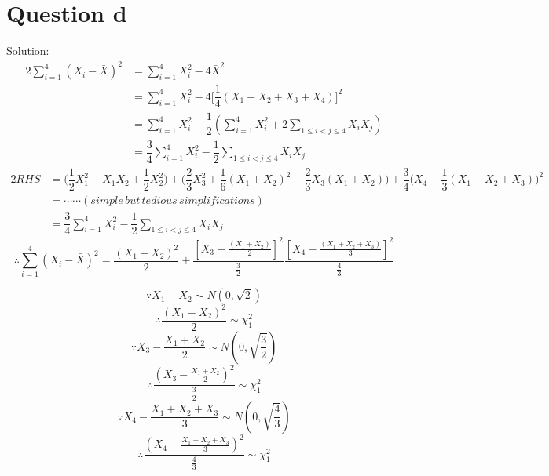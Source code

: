 \documentclass[a4papers]{ctexart}
\begin{document}
\section*{Question d}
\noindent Solution:
\begin{alignat*}{2}
    \sum_{i=1}^{4}\left( X_{i}-\bar {X}\right) ^{2}
    &=\sum ^{4}_{i=1}X^{2}_{i}-4\bar {X}^{2}\\
    &=\sum ^{4}_{i=1}X^{2}_{i}-4\Big[ \dfrac{1}{4}(X_1+X_2+X_3+X_4) \Big]^{2}\\  
    &=\sum ^{4}_{i=1}X^{2}_{i}-\dfrac {1}{2}\left( \sum ^{4}_{i=1}X^{2}_{i}+2\sum _{1\leq i < j\leq 4}X_{i}X_{j}\right) \\
    &=\dfrac {3}{4}\sum ^{4}_{i=1}X^{2}_{i}-\dfrac {1}{2}\sum _{1\leq i < j\leq 4}X_{i}X_{j}
\end{alignat*}
\begin{alignat*}{2}
    RHS  
    &=\Big( \dfrac {1}{2}X_1^{2}-X_{1}X_{2}+\dfrac {1}{2}X^{2}_{2} \Big)
     +\Big( \dfrac {2}{3}X^{2}_{3}+\dfrac {1}{6}\left( X_{1}+X_{2}\right) ^{2}-\dfrac {2}{3}X_{3}\left( X_{1}+X_{2}\right) \Big)
     +\dfrac{3}{4}\Big( X_4-\dfrac{1}{3}(X_1+X_2+X_3) \Big)^2\\
    &=\cdots \cdots(simple\, but\, tedious\, simplifications)\\
    &=\dfrac {3}{4}\sum ^{4}_{i=1}X^{2}_{i}-\dfrac {1}{2}\sum _{1\leq i < j\leq 4}X_{i}X_{j}
\end{alignat*}
\[\therefore 
\sum_{i=1}^{4}\left( X_{i}-\bar {X}\right) ^{2}=
\dfrac {\left( X_{1}-X_{2}\right) ^{2}}{2}+\dfrac {\left[ X_{3}-\frac {\left( X_{1}+X_{2}\right) }{2}\right] ^{2}}{\frac {3}{2}}
    \dfrac {\left[ X_{4}-\frac {\left( X_{1}+X_{2}+X_{3}\right) }{3}\right] ^{2}}{\frac {4}{3}}
  \]

\[\because X_1-X_2\sim N(0,\sqrt{2})\]
\[\therefore \dfrac{(X_1-X_2)^2}{2}\sim \chi_1^2\]
\[\because X_3-\dfrac{X_1+X_2}{2}\sim N(0,\sqrt{\dfrac{3}{2}})\]
\[\therefore \dfrac{(X_3-\frac{X_1+X_2}{2})^2}{\frac{3}{2}} \sim \chi_1^2\]
\[\because X_4-\dfrac{X_1+X_2+X_3}{3}\sim N(0,\sqrt{\dfrac{4}{3}})\]
\[\therefore \dfrac{(X_4-\frac{X_1+X_2+X_3}{3})^2}{\frac{4}{3}} \sim \chi_1^2\]
\end{document}
